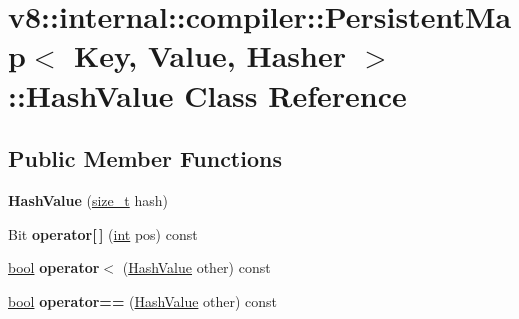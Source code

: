 \hypertarget{classv8_1_1internal_1_1compiler_1_1PersistentMap_1_1HashValue}{}\section{v8\+:\+:internal\+:\+:compiler\+:\+:Persistent\+Map$<$ Key, Value, Hasher $>$\+:\+:Hash\+Value Class Reference}
\label{classv8_1_1internal_1_1compiler_1_1PersistentMap_1_1HashValue}
\subsection*{Public Member Functions}
\begin{DoxyCompactItemize}
\item 
\mbox{\label{classv8_1_1internal_1_1compiler_1_1PersistentMap_1_1HashValue_afee8690366cb13cdda686000bc9ab0c6}} 
{\bfseries Hash\+Value} (\mbox{\hyperlink{classsize__t}{size\+\_\+t}} hash)
\item 
\mbox{\label{classv8_1_1internal_1_1compiler_1_1PersistentMap_1_1HashValue_a32530501ec836aebc2d1011f97f3ecfc}} 
Bit {\bfseries operator\mbox{[}$\,$\mbox{]}} (\mbox{\hyperlink{classint}{int}} pos) const
\item 
\mbox{\label{classv8_1_1internal_1_1compiler_1_1PersistentMap_1_1HashValue_ae2308180e03b9bf5aa913d5b5ca3bbb7}} 
\mbox{\hyperlink{classbool}{bool}} {\bfseries operator$<$} (\mbox{\hyperlink{classv8_1_1internal_1_1compiler_1_1PersistentMap_1_1HashValue}{Hash\+Value}} other) const
\item 
\mbox{\label{classv8_1_1internal_1_1compiler_1_1PersistentMap_1_1HashValue_a1387cb61ca1d7d32b8c5924d22f12f2a}} 
\mbox{\hyperlink{classbool}{bool}} {\bfseries operator==} (\mbox{\hyperlink{classv8_1_1internal_1_1compiler_1_1PersistentMap_1_1HashValue}{Hash\+Value}} other) const
\item 
\mbox{\label{classv8_1_1internal_1_1compiler_1_1PersistentMap_1_1HashValue_a1b82aac7ef0cb397edeaa2d81c2d1119}} 

\end{DoxyCompactItemize}
